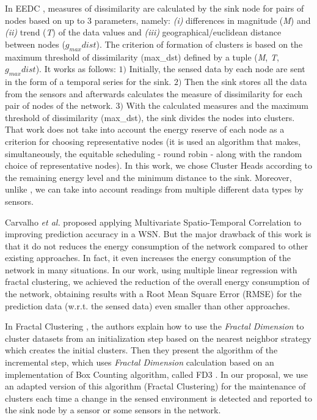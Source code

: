\documentclass{acm_proc_article-sp}
\begin{document}
In EEDC \cite{Liu2007}, measures of dissimilarity are calculated by the sink
node for pairs of nodes based on up to $3$ parameters, namely: {\it (i)}
differences in magnitude (\textit{M}) and {\it (ii)} trend (\textit{T}) of the
data values and {\it (iii)} geographical/euclidean distance between nodes
($g_{max}dist$).
The criterion of formation of clusters is based on the maximum threshold of
dissimilarity (max\_dst) defined by a tuple (\textit{M}, \textit{T},
$g_{max}dist$). It works as follows: $1)$ Initially, the sensed data by each
node are sent in the form of a temporal series for the sink. $2)$ Then the sink
stores all the data from the sensors and afterwards calculates the measure of
dissimilarity for each pair of nodes of the network. $3)$
With the calculated measures and the maximum threshold of dissimilarity
(max\_dst), the sink divides the nodes into clusters.
That work does not take into account the energy reserve of each node as a
criterion for choosing representative nodes (it is used an algorithm that makes,
simultaneously, the equitable scheduling - round robin - along with the random
choice of representative nodes). In this work, we chose Cluster Heads according
to the remaining energy level and the minimum distance to the sink. Moreover,
unlike \cite{Liu2007}, we can take into account readings from multiple different
data types by sensors.
\vspace*{-.3cm}

Carvalho \textit{et al.} \cite{Carvalho2011} proposed applying Multivariate
Spatio-Temporal Correlation to improving prediction accuracy in a WSN. But the
major drawback of this work is that it do not reduces the energy consumption of
the network compared to other existing approaches. In fact, it even increases
the energy consumption of the network in many situations. In our work, using
multiple linear regression with fractal clustering, we achieved the reduction of
the overall energy consumption of the network, obtaining results with a Root
Mean Square Error (RMSE) for the prediction data (w.r.t. the sensed data) even
smaller than other approaches.
\vspace*{-.3cm}

In Fractal Clustering \cite{Barbara2000}, the authors explain how to use the
\textit{Fractal Dimension} to cluster datasets from an initialization step
based on the nearest neighbor strategy which creates the initial clusters. Then
they present the algorithm of the incremental step, which uses \textit{Fractal
Dimension} calculation based on an implementation of Box Counting algorithm,
called FD3 \cite{Liebovitch1989}. In our proposal, we use an adapted version of
this algorithm (Fractal Clustering) for the maintenance of clusters each time a
change in the sensed environment is detected and reported to the sink node by
a sensor or some sensors in the network.
\end{document}
